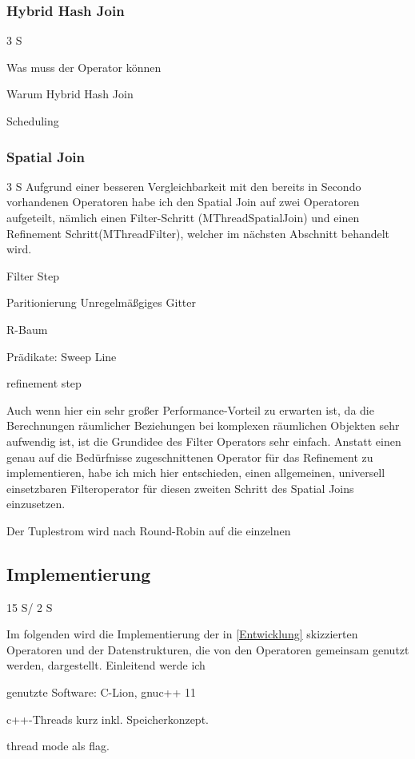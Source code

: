 \documentclass[a4paper,12pt,twoside]{article}
\begin{document}
\subsubsection{Hybrid Hash Join} 3 S

Was muss der Operator können

Warum Hybrid Hash Join

Scheduling



\subsubsection{Spatial Join} 3 S
Aufgrund einer besseren Vergleichbarkeit mit den bereits in Secondo vorhandenen Operatoren habe ich den Spatial Join auf zwei Operatoren aufgeteilt, nämlich einen Filter-Schritt (MThreadSpatialJoin) und einen Refinement Schritt(MThreadFilter), welcher im nächsten Abschnitt behandelt wird.

Filter Step

Paritionierung Unregelmäßgiges Gitter

R-Baum

Prädikate: Sweep Line

refinement step

Auch wenn hier ein sehr großer Performance-Vorteil zu erwarten ist, da die Berechnungen räumlicher Beziehungen bei komplexen räumlichen Objekten sehr aufwendig ist, ist die Grundidee des Filter Operators sehr einfach. Anstatt einen genau auf die Bedürfnisse zugeschnittenen Operator für das Refinement zu implementieren, habe ich mich hier entschieden, einen allgemeinen, universell einsetzbaren Filteroperator für diesen zweiten Schritt des Spatial Joins einzusetzen. 

Der Tuplestrom wird nach Round-Robin auf die einzelnen 

\subsection{Implementierung} 15 S/ 2 S

Im folgenden wird die Implementierung der in \autoref{Entwicklung} skizzierten Operatoren und der Datenstrukturen, die von den Operatoren gemeinsam genutzt werden, dargestellt. Einleitend werde ich 

genutzte Software: C-Lion, gnuc++ 11

c++-Threads kurz inkl. Speicherkonzept.

thread mode als flag.
\end{document}
